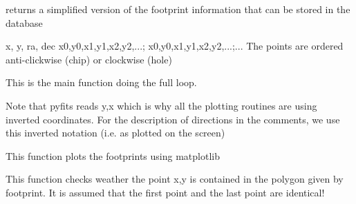 \documentclass[letterpaper,10pt,english]{sphinxmanual}
\begin{document}

\begin{fulllineitems}
\label{SamPy.astronomy:SamPy.astronomy.footprintfinder.getreturnstring}
returns a simplified version of the footprint information that can be stored in the database

x, y, ra, dec
x0,y0,x1,y1,x2,y2,...; x0,y0,x1,y1,x2,y2,...;...
The points are ordered anti-clickwise (chip) or clockwise (hole)

\end{fulllineitems}



\begin{fulllineitems}
\label{SamPy.astronomy:SamPy.astronomy.footprintfinder.main}
This is the main function doing the full loop.

Note that pyfits reads y,x which is why all the plotting routines are using inverted coordinates.
For the description of directions in the comments, we use this inverted notation (i.e. as plotted
on the screen)

\end{fulllineitems}



\begin{fulllineitems}
\label{SamPy.astronomy:SamPy.astronomy.footprintfinder.plotfootprints}
This function plots the footprints using matplotlib

\end{fulllineitems}



\begin{fulllineitems}
\label{SamPy.astronomy:SamPy.astronomy.footprintfinder.pointinpolygon}
This function checks weather the point x,y is contained in the polygon given by footprint.
It is assumed that the first point and the last point are identical!

\end{fulllineitems}
\end{document}
